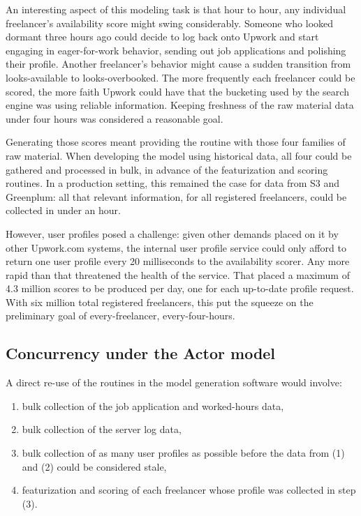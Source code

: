\documentclass{article}
\begin{document}
 An interesting aspect of this modeling task is that hour to hour, any
individual freelancer's availability score might swing considerably. Someone who
looked dormant three hours ago could decide to log back onto Upwork and start
engaging in eager-for-work behavior, sending out job applications and polishing
their profile. Another freelancer's behavior might cause a sudden transition
from looks-available to looks-overbooked. The more frequently each freelancer
could be scored, the more faith Upwork could have that the bucketing used by the
search engine was using reliable information. Keeping freshness of the raw
material data under four hours was considered a reasonable goal.

 Generating those scores meant providing the routine with those four families of
raw material. When developing the model using historical data, all four could be
gathered and processed in bulk, in advance of the featurization and scoring
routines. In a production setting, this remained the case for data from S3 and
Greenplum: all that relevant information, for all registered freelancers, could
be collected in under an hour.

 However, user profiles posed a challenge: given other demands placed on it by
other Upwork.com systems, the internal user profile service could only afford to
return one user profile every 20 milliseconds to the availability scorer. Any
more rapid than that threatened the health of the service. That placed a maximum
of 4.3 million scores to be produced per day, one for each up-to-date profile
request. With six million total registered freelancers, this put the squeeze on
the preliminary goal of every-freelancer, every-four-hours.

\subsection{Concurrency under the Actor model}

 A direct re-use of the routines in the model generation software would involve:


\begin{enumerate}
\item bulk collection of the job application and worked-hours data,
\item bulk collection of the server log data,
 \item bulk collection of as many user profiles as possible before the data from
(1) and (2) could be considered stale,
 \item featurization and scoring of each freelancer whose profile was collected
in step (3).
\end{enumerate}
\end{document}
